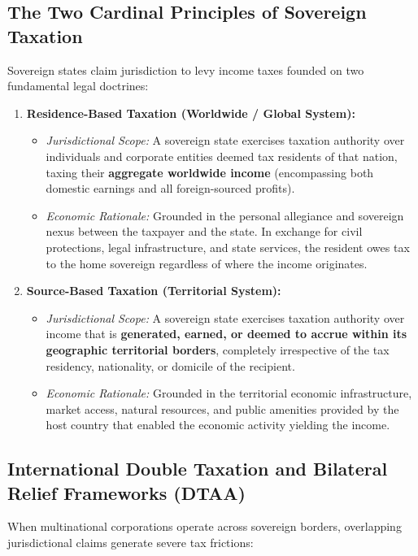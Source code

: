 \vspace{0.3em}

\subsection{The Two Cardinal Principles of Sovereign Taxation}
Sovereign states claim jurisdiction to levy income taxes founded on two fundamental legal doctrines:

\begin{enumerate}[leftmargin=1.8em, label=\textbf{\arabic*.}]
    \item \textbf{Residence-Based Taxation (Worldwide / Global System):}
    \begin{itemize}[leftmargin=1.5em]
        \item \textit{Jurisdictional Scope:} A sovereign state exercises taxation authority over individuals and corporate entities deemed tax residents of that nation, taxing their \textbf{aggregate worldwide income} (encompassing both domestic earnings and all foreign-sourced profits).
        \item \textit{Economic Rationale:} Grounded in the personal allegiance and sovereign nexus between the taxpayer and the state. In exchange for civil protections, legal infrastructure, and state services, the resident owes tax to the home sovereign regardless of where the income originates.
    \end{itemize}
    \item \textbf{Source-Based Taxation (Territorial System):}
    \begin{itemize}[leftmargin=1.5em]
        \item \textit{Jurisdictional Scope:} A sovereign state exercises taxation authority over income that is \textbf{generated, earned, or deemed to accrue within its geographic territorial borders}, completely irrespective of the tax residency, nationality, or domicile of the recipient.
        \item \textit{Economic Rationale:} Grounded in the territorial economic infrastructure, market access, natural resources, and public amenities provided by the host country that enabled the economic activity yielding the income.
    \end{itemize}
\end{enumerate}

\vspace{0.3em}

\subsection{International Double Taxation and Bilateral Relief Frameworks (DTAA)}
When multinational corporations operate across sovereign borders, overlapping jurisdictional claims generate severe tax frictions:

